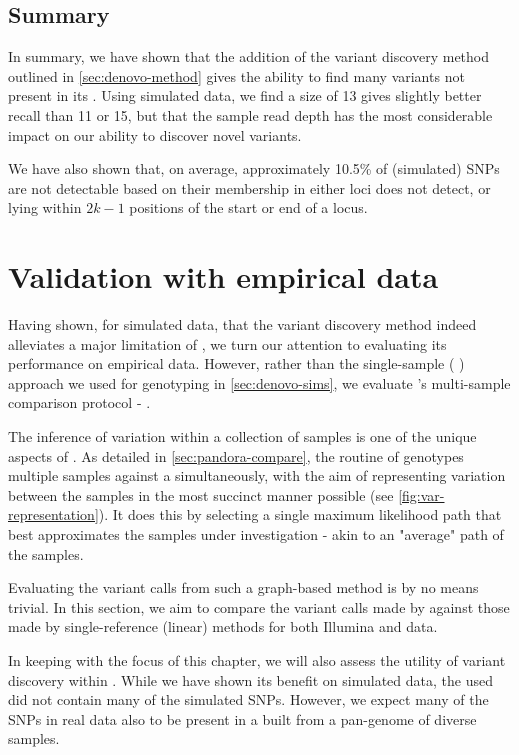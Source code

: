 \subsection{Summary}

In summary, we have shown that the addition of the \denovo{} variant discovery method outlined in \autoref{sec:denovo-method} gives \pandora{} the ability to find many variants not present in its \panrg{}. Using simulated data, we find a \kmer{} size of 13 gives slightly better recall than 11 or 15, but that the sample read depth has the most considerable impact on our ability to discover novel variants.

We have also shown that, on average, approximately 10.5\% of (simulated) SNPs are not detectable based on their membership in either loci \pandora{} does not detect, or lying within $2k-1$ positions of the start or end of a locus.

\section{Validation with empirical data}
\label{sec:denovo-empirical}

Having shown, for simulated data, that the \denovo{} variant discovery method indeed alleviates a major limitation of \pandora{}, we turn our attention to evaluating its performance on empirical data. However, rather than the single-sample (\pandora{} ) approach we used for genotyping in \autoref{sec:denovo-sims}, we evaluate \pandora{}'s multi-sample comparison protocol - \compare{}.

The inference of variation within a collection of samples is one of the unique aspects of \pandora{}. As detailed in \autoref{sec:pandora-compare}, the  routine of \pandora{} genotypes multiple samples against a \panrg{} simultaneously, with the aim of representing variation between the samples in the most succinct manner possible (see \autoref{fig:var-representation}). It does this by selecting a single maximum likelihood path that best approximates the samples under investigation - akin to an "average" path of the samples.

Evaluating the variant calls from such a graph-based method is by no means trivial. In this section, we aim to compare the variant calls made by \pandora{} against those made by single-reference (linear) methods for both Illumina and \ont{} data.

In keeping with the focus of this chapter, we will also assess the utility of \denovo{} variant discovery within \pandora{}. While we have shown its benefit on simulated data, the \panrg{} used did not contain many of the simulated SNPs. However, we expect many of the SNPs in real data also to be present in a \panrg{} built from a pan-genome of diverse samples. 


